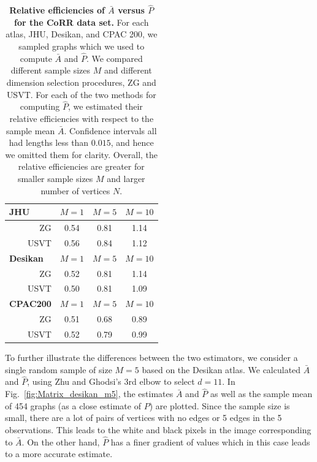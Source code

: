 \documentclass[10pt,letterpaper]{article}
\renewcommand{\hat}{\widehat}
\begin{document}
\begin{table}[!tb]
    \centering
\begin{tabular}{rccc}\toprule
\multicolumn{1}{l}{\textbf{JHU}} & $M=1$  & $M=5$  & $M=10$  \\\midrule
ZG      & 0.54 & 0.81 & 1.14 \\
USVT    & 0.56 & 0.84 & 1.12 \\\midrule
\multicolumn{1}{l}{\textbf{Desikan}} & $M=1$  & $M=5$  & $M=10$  \\ \midrule
ZG      & 0.52 & 0.81 & 1.14 \\
USVT    & 0.50 & 0.81 & 1.09 \\\midrule
\multicolumn{1}{l}{\textbf{CPAC200}} & $M=1$  & $M=5$  & $M=10$  \\\midrule
ZG      & 0.51 & 0.68 & 0.89 \\
USVT    & 0.52 & 0.79 & 0.99 \\\bottomrule
\end{tabular}
    \caption{{\bf Relative efficiencies of $\bar{A}$ versus $\hat{P}$ for the CoRR data set.}
    For each atlas, JHU, Desikan, and CPAC 200, we sampled graphs which we used to compute $\bar{A}$ and $\hat{P}$.
     We compared different sample sizes $M$ and different dimension selection procedures, ZG and USVT.
    For each of the two methods for computing $\hat{P}$, we estimated their relative efficiencies with respect to the sample mean $\bar{A}$.
    Confidence intervals all had lengths less than $0.015$, and hence we omitted them for clarity.
    Overall, the relative efficiencies are greater for smaller sample sizes $M$ and larger number of vertices $N$. 
    } 
    \label{tab:corr_re}
\end{table}



To further illustrate the differences between the two estimators, we consider a single random sample of size $M=5$ based on the Desikan atlas.
We calculated $\bar{A}$ and $\hat{P}$, using  Zhu and Ghodsi's 3rd elbow to select $d=11$. 
In Fig.~\ref{fig:Matrix_desikan_m5}, the estimates $\bar{A}$ and $\hat{P}$ as well as the sample mean of 454 graphs (as a close estimate of $P$) are plotted. 
Since the sample size is small, there are a lot of pairs of vertices with no edges or 5 edges in the 5 observations.
This leads to the white and black pixels in the image corresponding to $\bar{A}$.
On the other hand, $\hat{P}$ has a finer gradient of values which in this case leads to a more accurate estimate.
\end{document}
